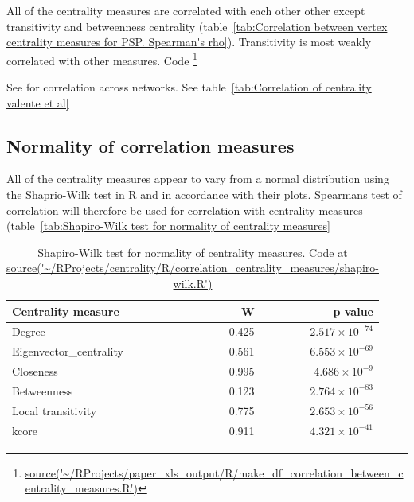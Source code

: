 All of the centrality measures are correlated with each other other except transitivity and betweenness centrality  (table~\ref{tab:Correlation between vertex centrality measures for PSP. Spearman's rho}). Transitivity is most weakly correlated with other measures. Code \footnote{\url{source('~/RProjects/paper_xls_output/R/make_df_correlation_between_centrality_measures.R')}}



See \cite{oldham2019consistency} for correlation across networks. See table~\ref{tab:Correlation of centrality valente et al}

\subsection{Normality of correlation measures}
All of the centrality measures appear to vary from a normal distribution using the Shaprio-Wilk test in R and in accordance with their plots. Spearmans test of correlation will therefore be used for correlation with centrality measures (table~\ref{tab:Shapiro-Wilk test for normality of centrality measures}

\begin{table}[ht]
\centering
\begin{tabular}{lrr}
  \hline
Centrality measure & W & p value \\ 
  \hline
Degree & 0.425 & $2.517 \times 10^{-74}$ \\ 
  Eigenvector\_centrality & 0.561 & $6.553 \times 10^{-69}$ \\ 
  Closeness & 0.995 & $4.686 \times 10^{-9}$ \\ 
  Betweenness & 0.123 & $2.764 \times 10^{-83}$ \\ 
  Local transitivity & 0.775 & $2.653 \times 10^{-56}$ \\ 
  kcore & 0.911 & $4.321 \times 10^{-41}$ \\ 
   \hline
\end{tabular}
\caption{Shapiro-Wilk test for normality of centrality measures. Code at \url{source('~/RProjects/centrality/R/correlation_centrality_measures/shapiro-wilk.R')}} 
\label{Table:Test for normality (Shapiro-Wilk) for centrality measures of PSP}
\end{table}

